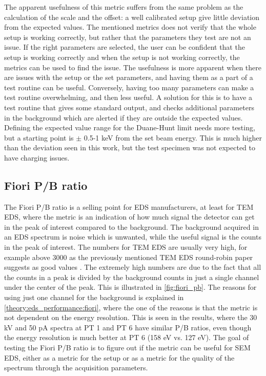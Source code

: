 The apparent usefulness of this metric suffers from the same problem as the calculation of the scale and the offset: a well calibrated setup give little deviation from the expected values.
The mentioned metrics does not verify that the whole setup is working correctly, but rather that the parameters they test are not an issue.
If the right parameters are selected, the user can be confident that the setup is working correctly and when the setup is not working correctly, the metrics can be used to find the issue.
The usefulness is more apparent when there are issues with the setup or the set parameters, and having them as a part of a test routine can be useful.
Conversely, having too many parameters can make a test routine overwhelming, and then less useful.
A solution for this is to have a test routine that gives some standard output, and checks additional parameters in the background which are alerted if they are outside the expected values.
Defining the expected value range for the Duane-Hunt limit needs more testing, but a starting point is $\pm$ 0.5-1 keV from the set beam energy.
This is much higher than the deviation seen in this work, but the test specimen was not expected to have charging issues.





\subsection{Fiori P/B ratio}
\label{discussion:fiori_peak_to_background_ratio}

The Fiori P/B ratio is a selling point for EDS manufacturers, at least for TEM EDS, where the metric is an indication of how much signal the detector can get in the peak of interest compared to the background.
The background acquired in an EDS spectrum is noise which is unwanted, while the useful signal is the counts in the peak of interest.
The numbers for TEM EDS are usually very high, for example above 3000 as the previously mentioned TEM EDS round-robin paper suggests as good values \cite{bennett_egerton_1995,ted_pella_nio_tem_2019}.
The extremely high numbers are due to the fact that all the counts in a peak is divided by the background counts in just a single channel under the center of the peak.
This is illustrated in \cref{fig:fiori_pb}.
The reasons for using just one channel for the background is explained in \cref{theory:eds_performance:fiori}, where the one of the reasons is that the metric is not dependent on the energy resolution.
This is seen in the results, where the 30 kV and 50 pA spectra at PT 1 and PT 6 have similar P/B ratios, even though the energy resolution is much better at PT 6 (158 eV vs. 127 eV).
The goal of testing the Fiori P/B ratio is to figure out if the metric can be useful for SEM EDS, either as a metric for the setup or as a metric for the quality of the spectrum through the acquisition parameters.


